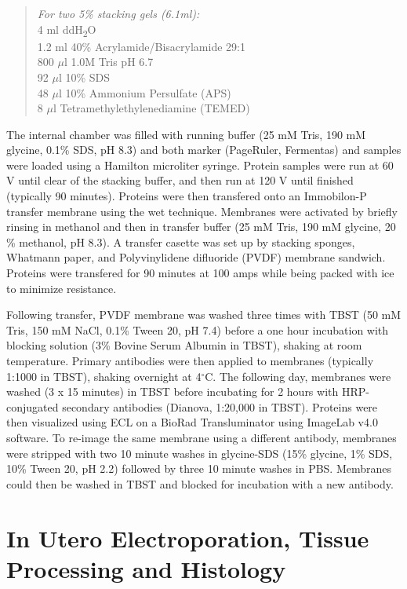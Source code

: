 \documentclass[onehalf,12pt]{beavtex}
\begin{document}
  \begin{quote}
  \emph{For two 5\% stacking gels (6.1ml):}\\
  4 ml ddH\textsubscript{2}O\\
  1.2 ml 40\% Acrylamide/Bisacrylamide 29:1\\
  800 \(\mu\)l 1.0M Tris pH 6.7\\
  92 \(\mu\)l 10\% SDS\\
  48 \(\mu\)l 10\% Ammonium Persulfate (APS)\\
  8 \(\mu\)l Tetramethylethylenediamine (TEMED)
  \end{quote}
  
  The internal chamber was filled with running buffer (25 mM Tris, 190 mM
  glycine, 0.1\% SDS, pH 8.3) and both marker (PageRuler, Fermentas) and
  samples were loaded using a Hamilton microliter syringe. Protein samples
  were run at 60 V until clear of the stacking buffer, and then run at 120
  V until finished (typically 90 minutes). Proteins were then transfered
  onto an Immobilon-P transfer membrane using the wet technique. Membranes
  were activated by briefly rinsing in methanol and then in transfer
  buffer (25 mM Tris, 190 mM glycine, 20 \% methanol, pH 8.3). A transfer
  casette was set up by stacking sponges, Whatmann paper, and
  Polyvinylidene difluoride (PVDF) membrane sandwich. Proteins were
  transfered for 90 minutes at 100 amps while being packed with ice to
  minimize resistance.
  
  Following transfer, PVDF membrane was washed three times with TBST (50
  mM Tris, 150 mM NaCl, 0.1\% Tween 20, pH 7.4) before a one hour
  incubation with blocking solution (3\% Bovine Serum Albumin in TBST),
  shaking at room temperature. Primary antibodies were then applied to
  membranes (typically 1:1000 in TBST), shaking overnight at 4\(^\circ\)C.
  The following day, membranes were washed (3 x 15 minutes) in TBST before
  incubating for 2 hours with HRP-conjugated secondary antibodies
  (Dianova, 1:20,000 in TBST). Proteins were then visualized using ECL on
  a BioRad Transluminator using ImageLab v4.0 software. To re-image the
  same membrane using a different antibody, membranes were stripped with
  two 10 minute washes in glycine-SDS (15\% glycine, 1\% SDS, 10\% Tween
  20, pH 2.2) followed by three 10 minute washes in PBS. Membranes could
  then be washed in TBST and blocked for incubation with a new antibody.
  
  \section{In Utero Electroporation, Tissue Processing and
  Histology}\label{in-utero-electroporation-tissue-processing-and-histology}
  
\end{document}
